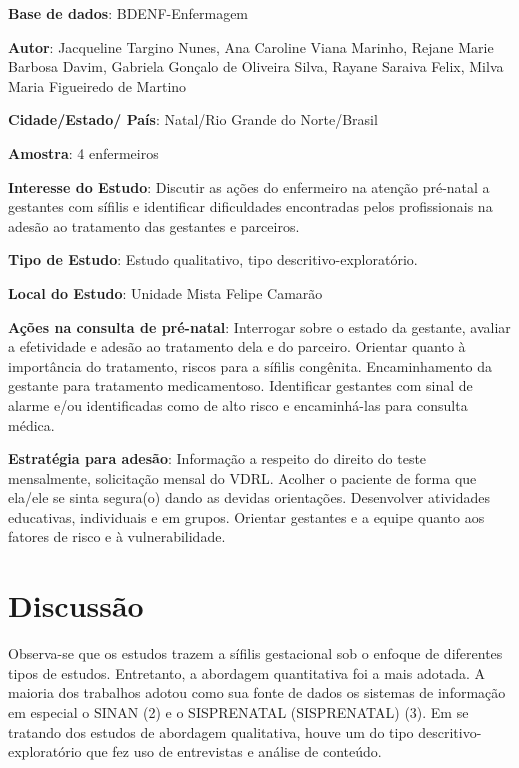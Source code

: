 \begin{description}
\item \textbf{Base de dados}: BDENF-Enfermagem
\item \textbf{Autor}: Jacqueline Targino Nunes, Ana Caroline Viana Marinho, Rejane Marie Barbosa Davim, Gabriela Gonçalo de Oliveira Silva, Rayane Saraiva Felix, Milva Maria Figueiredo de Martino
\item \textbf{Cidade/Estado/ País}: Natal/Rio Grande do Norte/Brasil
\item \textbf{Amostra}: 4 enfermeiros 
\item \textbf{Interesse do Estudo}: Discutir as ações do enfermeiro na atenção pré-natal a gestantes com sífilis e identificar dificuldades encontradas pelos profissionais na adesão ao tratamento das gestantes e parceiros.
\item \textbf{Tipo de Estudo}: Estudo qualitativo, tipo descritivo-exploratório.
\item \textbf{Local do Estudo}: Unidade Mista Felipe Camarão
\item \textbf{Ações na consulta de pré-natal}: Interrogar sobre o estado da gestante, avaliar a efetividade e adesão ao tratamento dela e do parceiro. Orientar quanto à importância do tratamento, riscos para a sífilis congênita. Encaminhamento da gestante para tratamento medicamentoso. Identificar gestantes com sinal de alarme e/ou identificadas como de alto risco e encaminhá-las para consulta médica.
\item \textbf{Estratégia para adesão}: Informação a respeito do direito do teste mensalmente, solicitação mensal do VDRL. Acolher o paciente de forma que ela/ele se sinta segura(o) dando as devidas orientações. Desenvolver atividades educativas, individuais e em grupos. Orientar gestantes e a equipe quanto aos fatores de risco e à vulnerabilidade.
\end{description}

\chapter{Discussão}
\label{chap:discussao}

Observa-se que os estudos trazem a sífilis gestacional sob o enfoque de diferentes tipos de estudos. Entretanto, a abordagem quantitativa foi a mais adotada. A maioria dos trabalhos adotou como sua fonte de dados os sistemas de informação em especial o \acrshort{SINAN} (2) e o \acrshort{SISPRENATAL} (\acrlong{SISPRENATAL}) (3). Em se tratando dos estudos de abordagem qualitativa, houve um do tipo descritivo-exploratório que fez uso de entrevistas e análise de conteúdo.

